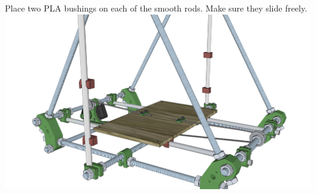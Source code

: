 \documentclass[twoside,a4paper,titlepage]{memoir}
\begin{document}
	\section{}
	Place two PLA bushings on each of the smooth rods. Make sure they slide freely.\\
	\includegraphics[width=1\linewidth]{graphics/ch8_9.png}
	
\end{document}
